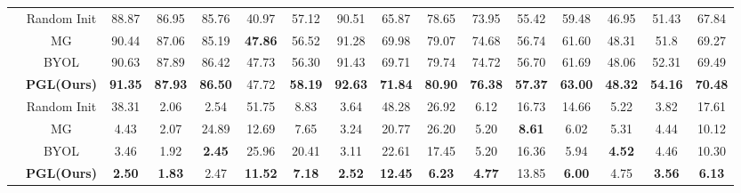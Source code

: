 {\begin{center}
{\begin{tabular}{|c|c|c|c|c|c|c|c|c|c|c|c|c|c|c|c|}
    \rowcolor[HTML]{EBECFE} 
    \cellcolor[HTML]{EBECFE}                       & Random Init & 88.87 & 86.95 & 85.76 & 40.97 & 57.12 & 90.51 & 65.87 & 78.65 & 73.95 & 55.42  & 59.48 & 46.95 & 51.43 & 67.84                 \\ \cline{2-16} 
    \rowcolor[HTML]{EBECFE} 
    \cellcolor[HTML]{EBECFE}                       & MG & 90.44 & 87.06 & 85.19 & \textbf{47.86} & 56.52 & 91.28 & 69.98 & 79.07 & 74.68 & 56.74  & 61.60 & 48.31 & 51.8  & 69.27                 \\ \cline{2-16} 
    \rowcolor[HTML]{EBECFE} 
    \cellcolor[HTML]{EBECFE}                       & BYOL& 90.63 & 87.89 & 86.42 & 47.73 & 56.30 & 91.43 & 69.71 & 79.74 & 74.72 & 56.70  & 61.69 & 48.06 & 52.31 & 69.49                 \\ \cline{2-16} 
    \rowcolor[HTML]{EBECFE} 
    \multirow{-4}{*}{\cellcolor[HTML]{EBECFE}IoU~$\uparrow$}  & \textbf{PGL(Ours)} & \textbf{91.35} & \textbf{87.93} & \textbf{86.50} & 47.72 & \textbf{58.19} & \textbf{92.63} & \textbf{71.84} & \textbf{80.90} & \textbf{76.38} & \textbf{57.37}  & \textbf{63.00} & \textbf{48.32} & \textbf{54.16} & \textbf{70.48}                 \\ \hline
    \rowcolor[HTML]{FEFED6} 
    \cellcolor[HTML]{FEFED6}                       & Random Init & 38.31 & 2.06  & 2.54  & 51.75 & 8.83  & 3.64  & 48.28 & 26.92 & 6.12  & 16.73  & 14.66 & 5.22  & 3.82  & 17.61                 \\ \cline{2-16} 
    \rowcolor[HTML]{FEFED6} 
    \cellcolor[HTML]{FEFED6}                       & MG & 4.43  & 2.07  & 24.89 & 12.69 & 7.65  & 3.24  & 20.77 & 26.20 & 5.20  & \textbf{8.61}   & 6.02  & 5.31  & 4.44  & 10.12                 \\ \cline{2-16} 
    \rowcolor[HTML]{FEFED6} 
    \cellcolor[HTML]{FEFED6}                       & BYOL& 3.46  & 1.92  & \textbf{2.45}  & 25.96 & 20.41 & 3.11  & 22.61 & 17.45 & 5.20  & 16.36  & 5.94  & \textbf{4.52}  & 4.46  & 10.30                 \\ \cline{2-16} 
    \rowcolor[HTML]{FEFED6} 
    \multirow{-4}{*}{\cellcolor[HTML]{FEFED6}HD~$\downarrow$} & \textbf{PGL(Ours)} & \textbf{2.50}  & \textbf{1.83}  & 2.47  & \textbf{11.52} & \textbf{7.18}  & \textbf{2.52}  & \textbf{12.45} & \textbf{6.23}  & \textbf{4.77}  & 13.85  & \textbf{6.00}  & 4.75  & \textbf{3.56}  & \textbf{6.13}                  \\ \hline
    \end{tabular}
    }
\end{center}
}
